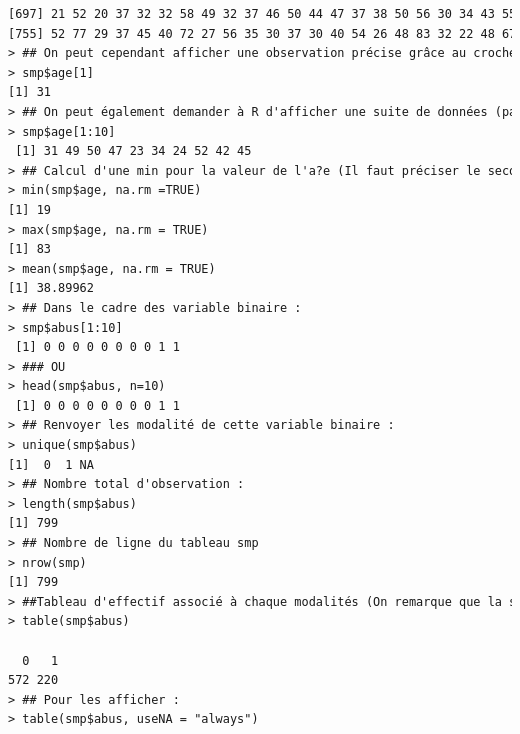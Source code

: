 \begin{lstlisting}[language=html]
[697] 21 52 20 37 32 32 58 49 32 37 46 50 44 47 37 38 50 56 30 34 43 55 43 31 55 41 68 45 48 42 71 38 46 65 51 57 57 71 40 43 71 48 34 69 43 35 62 34 51 48 36 44 49 74 19 56 57 65
[755] 52 77 29 37 45 40 72 27 56 35 30 37 30 40 54 26 48 83 32 22 48 67 58 37 24 34 39 38 39 56 35 26 70 68 42 41 40 26 50 27 28 44 31 38 71
> ## On peut cependant afficher une observation précise grâce au crochets.
> smp$age[1]
[1] 31
> ## On peut également demander à R d'afficher une suite de données (par exemple les dix premières)
> smp$age[1:10]
 [1] 31 49 50 47 23 34 24 52 42 45
> ## Calcul d'une min pour la valeur de l'a?e (Il faut préciser le second paramètre sinon il n'enlève pas les valeurs manquante et nous renvoi NA)
> min(smp$age, na.rm =TRUE)
[1] 19
> max(smp$age, na.rm = TRUE)
[1] 83
> mean(smp$age, na.rm = TRUE)
[1] 38.89962
> ## Dans le cadre des variable binaire :
> smp$abus[1:10]
 [1] 0 0 0 0 0 0 0 0 1 1
> ### OU
> head(smp$abus, n=10)
 [1] 0 0 0 0 0 0 0 0 1 1
> ## Renvoyer les modalité de cette variable binaire :
> unique(smp$abus)
[1]  0  1 NA
> ## Nombre total d'observation :
> length(smp$abus)
[1] 799
> ## Nombre de ligne du tableau smp
> nrow(smp)
[1] 799
> ##Tableau d'effectif associé à chaque modalités (On remarque que la somme des effectifs n'est pas égales à 799, cela provient du fait que les variables NA ne sont pas affichées)
> table(smp$abus)

  0   1 
572 220 
> ## Pour les afficher :
> table(smp$abus, useNA = "always")


\end{lstlisting}
